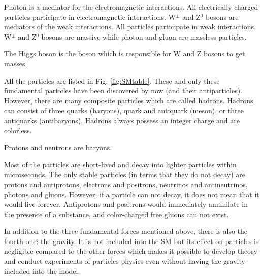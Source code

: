 Photon is a mediator for the electromagnetic interactions. All electrically charged particles participate in electromagnetic interactions. W$^{\pm}$ and Z$^0$ bosons are mediators of the weak interactions. All particles participate in weak interactions. W$^{\pm}$ and Z$^0$ bosons are massive while photon and gluon are massless particles. 

The Higgs boson is the boson which is responsible for W and Z bosons to get masses.

All the particles are listed in Fig. \ref{fig:SMtable}. These and only these fundamental particles have been discovered by now (and their antiparticles). However, there are many composite particles which are called hadrons. Hadrons can consist of three quarks (baryons), quark and antiquark (meson), or three antiquarks (antibaryons). Hadrons always possess an integer charge and are colorless.

Protons and neutrons are baryons.

Most of the particles are short-lived and decay into lighter particles within microseconds. The only stable particles (in terms that they do not decay) are protons and antiprotons, electrons and positrons, neutrinos and antineutrinos, photons and gluons. However, if a particle can not decay, it does not mean that  it would live forever. Antiprotons and positrons would immediately annihilate in the presence of a substance, and color-charged free gluons can not exist.

In addition to the three fundamental forces mentioned above, there is also the fourth one: the gravity. It is not included into the SM but its effect on particles is negligible compared to the other forces which makes it possible to develop theory and conduct experiments of particles physics even without having the gravity included into the model.



